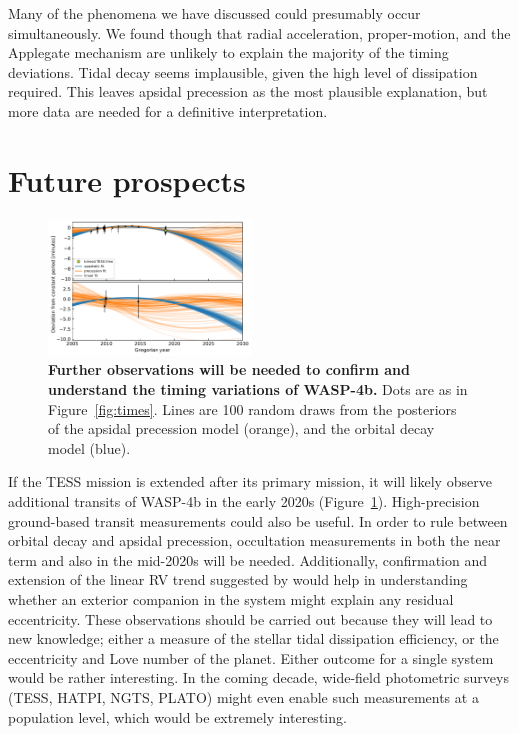 \documentclass[12pt,twocolumn,tighten]{aastex62}
\begin{document}
Many of the phenomena we have discussed could presumably occur
simultaneously.  We found though that radial acceleration,
proper-motion, and the Applegate mechanism are unlikely to explain the
majority of the timing deviations.  Tidal decay seems implausible,
given the high level of dissipation required.  This leaves apsidal
precession as the most plausible explanation, but more data are needed
for a definitive interpretation.


\section{Future prospects}
\label{sec:future}

\begin{figure}[!t]
	\begin{center}
		\leavevmode
		\includegraphics[width=0.48\textwidth]{f5.pdf}
	\end{center}
  \vspace{-0.5cm}
	\caption{
		{\bf Further observations will be needed to
	    confirm and understand the timing variations of WASP-4b.}
		Dots are as in Figure~\ref{fig:times}.
		Lines are 100 random draws from the posteriors of the apsidal
		precession model (orange), and the orbital decay model (blue).    
		\label{fig:future}
	}
\end{figure}

If the TESS mission is extended after its primary mission, it will
likely observe additional transits of WASP-4b in the early 2020s
(Figure~\ref{fig:future}).  High-precision ground-based transit
measurements could also be useful.  In order to rule between orbital
decay and apsidal precession, occultation measurements in both the
near term and also in the mid-2020s will be needed.  Additionally,
confirmation and extension of the linear RV trend suggested by
\citet{knutson_friends_2014} would help in understanding whether an
exterior companion in the system might explain any residual
eccentricity.  These observations should be carried out because they
will lead to new knowledge; either a measure of the stellar tidal
dissipation efficiency, or the eccentricity and Love number of the
planet.  Either outcome for a single system would be rather
interesting.  In the coming decade, wide-field photometric surveys
(TESS, HATPI, NGTS, PLATO) might even enable such measurements at a
population level, which would be extremely interesting.
\end{document}
